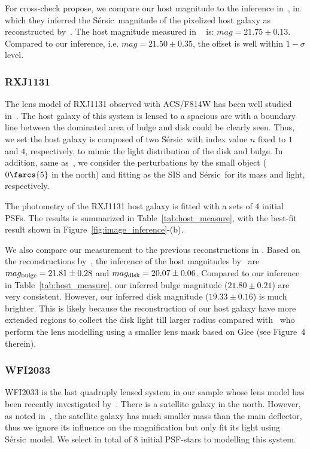 \documentclass[fleqn,usenatbib]{mnras}
\newcommand{\sersic}{S\'ersic}
\begin{document}
For cross-check propose, we compare our host magnitude to the inference in~\citet{Ding2017b}, in which they inferred the \sersic\ magnitude of the pixelized host galaxy as reconstructed by~\citet{Wong2017}. The host magnitude measured in ~\citet{Ding2017b} is: $mag = 21.75 \pm 0.13$. %
Compared to our inference, i.e. $mag = 21.50 \pm 0.35$, the offset is well within $1-\sigma$ level.

\subsubsection{RXJ1131}
The lens model of RXJ1131 observed with ACS/F814W has been well studied in~\citet{Suyu2013}. The host galaxy of this system is lensed to a spacious arc with a boundary line between the dominated area of bulge and disk could be clearly seen. Thus, we set the host galaxy is composed of two \sersic\ with index value $n$ fixed to $1$ and $4$, respectively, to mimic the light distribution of the disk and bulge. In addition, same as~\citet{Suyu2013}, we consider the perturbations by the small object ($0\farcs{5}$ in the north) and fitting as the SIS and \sersic\ for its mass and light, respectively.

The photometry of the RXJ1131 host galaxy is fitted with a sets of 4 initial PSFs. The results is summarized in Table~\ref{tab:host_measure}, with the best-fit result shown in Figure~\ref{fig:image_inference}-(b).

We also compare our measurement to the previous reconstructions in \citet{Ding2017b}. Based on the reconstructions by~\citet{Suyu2013}, the inference of the host magnitudes by~\citet{Ding2017b} are $mag_{\rm bulge} = 21.81 \pm 0.28$ and $mag_{\rm disk} = 20.07\pm0.06$. Compared to our inference in Table~\ref{tab:host_measure}, our inferred bulge magnitude ($21.80\pm0.21$) are very consistent. However, our inferred disk magnitude ($19.33\pm0.16$) is much brighter. This is likely because the reconstruction of our host galaxy have more extended regions to collect the disk light till larger radius compared with~\citet{Suyu2013} who perform the lens modelling using a smaller lens mask based on {\sc Glee} (see Figure~4 therein). 

\subsubsection{WFI2033}
WFI2033 is the last quadruply lensed system in our sample whose lens model has been recently investigated by~\citet{Rusu2019}. There is a satellite galaxy in the north. However, as noted in~\citet{Rusu2019}, the satellite galaxy has much smaller mass than the main deflector, thus we ignore its influence on the magnification but only fit its light using \sersic\ model. We select in total of 8 initial PSF-stars to modelling this system.
\end{document}
